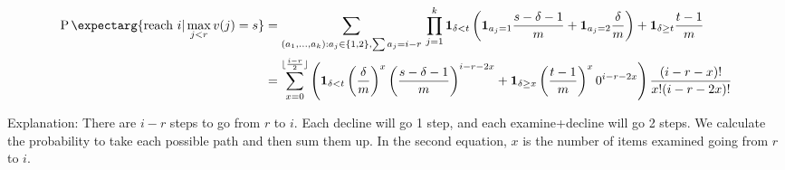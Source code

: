 \documentclass{article}
\newcommand{\prob}{\operatorname{P}\expectarg}
\begin{document}
\begin{align}
  \prob{\text{reach }i|\max_{j<r}v(j)= s}
  &= \sum_{(a_1,\dots,a_k):a_j\in\{1,2\},\sum a_j = i-r} \,\prod_{j=1}^k 
  \ind_{\delta<t}
  \left(\ind_{a_j = 1}\frac{s-\delta-1}{m}
  +\ind_{a_j = 2}\frac{\delta}{m}
  \right)
  +\ind_{\delta\geq t}\frac{t-1}{m}
  \\
  &= \sum_{x=0}^{\lfloor\frac{i-r}{2}\rfloor} 
  \left(
  		\ind_{\delta<t}\left(\frac{\delta}{m}\right)^x\left(\frac{s-\delta-1}{m}\right)^{i-r-2x}
  		+\ind_{\delta \geq x} \left(\frac{t-1}{m}\right)^x 0^{i-r-2x}
  \right)
  \frac{(i-r-x)!}{x!(i-r-2x)!}
\end{align}

Explanation: There are $i-r$ steps to go from $r$ to $i$. Each decline will go 1 step, and each examine+decline will go 2 steps. We calculate the probability to take each possible path and then sum them up. In the second equation, $x$ is the number of items examined going from $r$ to $i$.
\end{document}
